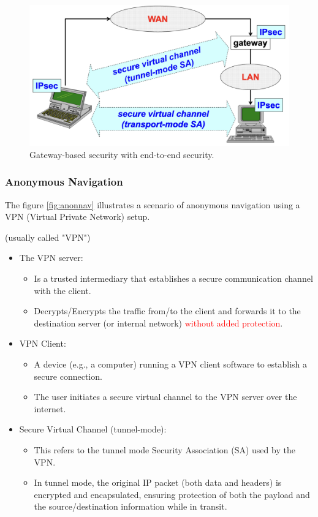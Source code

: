 \begin{figure}[H]
  \includegraphics[width=\linewidth]{Images/NetSec/gatsec_end.png}
  \caption{Gateway-based security with end-to-end security.}
  \label{fig:gat_end}
\end{figure}

\subsubsection{Anonymous Navigation}
The figure \ref{fig:anonnav} illustrates a scenario of anonymous navigation using a VPN (Virtual Private Network) setup.
\begin{center}
    (usually called "VPN")
\end{center}


\begin{itemize}
    \item The VPN server:
    \begin{itemize}
        \item Is a trusted intermediary that establishes a secure communication channel with the client. 
        \item Decrypts/Encrypts the traffic from/to the client and forwards it to the destination server (or internal network) \textcolor{red}{without added protection}. 
    \end{itemize}
    \item VPN Client:
    \begin{itemize}
        \item A device (e.g., a computer) running a VPN client software to establish a secure connection.
        \item The user initiates a secure virtual channel to the VPN server over the internet.
    \end{itemize}
    \item Secure Virtual Channel (tunnel-mode):
    \begin{itemize}
        \item This refers to the tunnel mode Security Association (SA) used by the VPN.
        \item In tunnel mode, the original IP packet (both data and headers) is encrypted and encapsulated, ensuring protection of both the payload and the source/destination information while in transit.
    \end{itemize}
\end{itemize}

